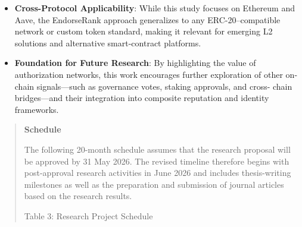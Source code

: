 \documentclass[
]{article}
\begin{document}
\begin{itemize}
\item
  \textbf{Cross-Protocol Applicability}: While this study focuses on Ethereum and Aave, the EndorseRank approach generalizes to any ERC-20--compatible network or custom token standard, making it relevant for emerging L2 solutions and alternative smart-contract platforms.
\item
  \textbf{Foundation for Future Research}: By highlighting the value of authorization networks, this work encourages further exploration of other on-chain signals---such as governance votes, staking approvals, and cross- chain bridges---and their integration into composite reputation and identity frameworks.
\end{itemize}

\begin{quote}
\protect{}\label{ckhs5wg3oxgf}{}\textbf{Schedule}

The following 20-month schedule assumes that the research proposal will be approved by 31 May 2026. The revised timeline therefore begins with post-approval research activities in June 2026 and includes thesis-writing milestones as well as the preparation and submission of journal articles based on the research results.

Table 3: Research Project Schedule
\end{quote}
\end{document}
